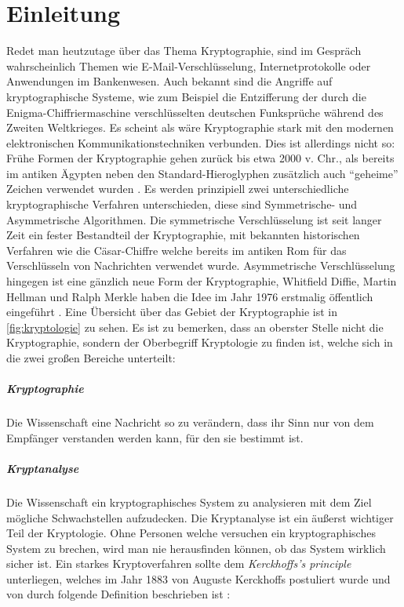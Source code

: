 \chapter{Einleitung}
Redet man heutzutage über das Thema Kryptographie, sind im Gespräch wahrscheinlich
Themen wie E-Mail-Verschlüsselung, Internetprotokolle oder Anwendungen im
Bankenwesen. Auch bekannt sind die Angriffe auf kryptographische Systeme,
wie zum Beispiel die Entzifferung der durch die Enigma-Chiffriermaschine
verschlüsselten deutschen Funksprüche während des Zweiten Weltkrieges. Es scheint als
wäre Kryptographie stark mit den modernen elektronischen Kommunikationstechniken
verbunden. Dies ist allerdings nicht so: Frühe Formen der Kryptographie
gehen zurück bis etwa 2000 v. Chr., als bereits im antiken Ägypten neben den
Standard-Hieroglyphen zusätzlich auch \enquote{geheime} Zeichen
verwendet wurden \parencite[2]{BOOK:crypto}. Es werden prinzipiell zwei
unterschiedliche kryptographische Verfahren unterschieden, diese sind
Symmetrische- und Asymmetrische Algorithmen. Die symmetrische Verschlüsselung ist
seit langer Zeit ein fester Bestandteil der Kryptographie, mit bekannten historischen
Verfahren wie die Cäsar-Chiffre welche bereits im antiken Rom für das Verschlüsseln von
Nachrichten verwendet wurde. Asymmetrische Verschlüsselung hingegen ist eine gänzlich neue Form
der Kryptographie, Whitfield Diffie, Martin Hellman und Ralph Merkle haben die Idee im Jahr
1976 erstmalig öffentlich eingeführt \parencite[3]{BOOK:crypto}.
Eine Übersicht über das Gebiet der Kryptographie ist in \autoref{fig:kryptologie} zu sehen.
Es ist zu bemerken, dass an oberster Stelle nicht die Kryptographie, sondern
der Oberbegriff Kryptologie zu finden ist, welche sich in die zwei großen Bereiche unterteilt:



\paragraph{Kryptographie}
Die Wissenschaft eine Nachricht so zu verändern, dass ihr Sinn nur von dem Empfänger
verstanden werden kann, für den sie bestimmt ist.

\paragraph{Kryptanalyse}
Die Wissenschaft ein kryptographisches System zu analysieren mit dem Ziel mögliche
Schwachstellen aufzudecken. Die Kryptanalyse ist ein äußerst wichtiger Teil der
Kryptologie. Ohne Personen welche versuchen ein kryptographisches System zu
brechen, wird man nie herausfinden können, ob das System wirklich sicher ist.
Ein starkes Kryptoverfahren sollte dem \textit{Kerckhoffs's principle} unterliegen, welches
im Jahr 1883 von Auguste Kerckhoffs postuliert wurde und von \citeauthor{BOOK:crypto}
durch folgende Definition beschrieben ist \parencite*[11]{BOOK:crypto}:

